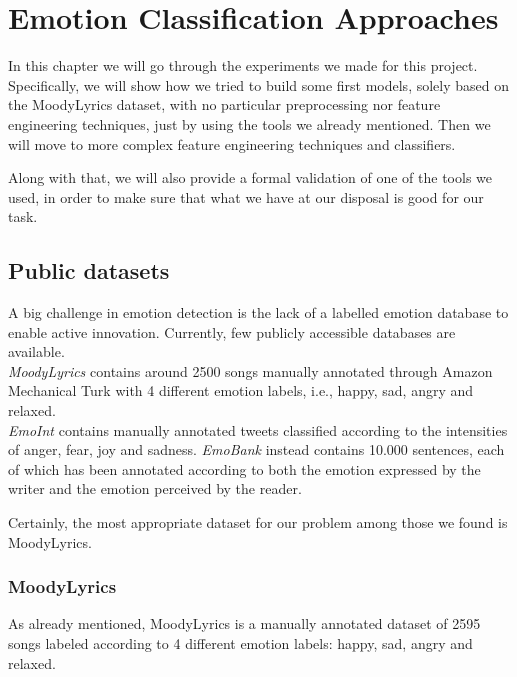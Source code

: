 \chapter{Emotion Classification Approaches}

In this chapter we will go through the experiments we made for this
project. Specifically, we will show how we tried to build some first models, solely 
based on the MoodyLyrics dataset, with no particular preprocessing nor feature
engineering techniques, just by using the tools we already mentioned. Then we will
move to more complex feature engineering techniques and classifiers.

Along with that, we will also provide a formal validation of one of the tools we used, in
order to make sure that what we have at our disposal is good for our task.

\section{Public datasets}
A big challenge in emotion detection is the lack of a labelled emotion database to enable active innovation. Currently, few publicly accessible databases are available.\\\textit{MoodyLyrics}\cite{moodylyrics} contains around 2500 songs manually annotated through Amazon Mechanical Turk with 4 different emotion labels, i.e., happy, sad, angry and relaxed.\\
\textit{EmoInt}\cite{emoint} contains manually annotated tweets classified according to the intensities of anger, fear, joy and sadness. \textit{EmoBank}\cite{emobank} instead contains 10.000 sentences, each of which has been annotated according to both the emotion expressed by the writer and the emotion perceived by the reader.

Certainly, the most appropriate dataset for our problem among those we found is MoodyLyrics.

\subsection{MoodyLyrics}

As already mentioned, MoodyLyrics is a manually annotated dataset of 2595 songs labeled according to 4
different emotion labels: happy, sad, angry and relaxed.

